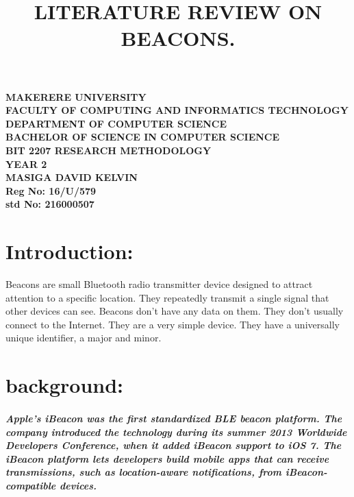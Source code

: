 \documentclass[a4paper,12pt]{article}
\begin{document}
\begin{Huge}
\begin{center}
\begin{normalsize}

\textbf{MAKERERE UNIVERSITY } \\
\textbf{FACULTY OF COMPUTING AND INFORMATICS TECHNOLOGY} \\
\textbf{DEPARTMENT OF COMPUTER SCIENCE} \\
\textbf{BACHELOR OF SCIENCE IN COMPUTER SCIENCE} \\
\textbf{BIT 2207 RESEARCH METHODOLOGY} \\
\textbf{YEAR 2} \\


\textbf{\sc MASIGA DAVID KELVIN } \\
\textbf{\sc Reg No: 16/U/579 } \\
\textbf{\sc std No: 216000507}\\
\end{normalsize}
\end{center}
\end{Huge}
\newpage

\title{LITERATURE REVIEW ON BEACONS.}
\maketitle    
\section{Introduction:}
Beacons are small Bluetooth radio transmitter device designed to attract attention to a specific location. They repeatedly transmit a single signal that other devices can see. Beacons don't have any data on them. They don't usually connect to the Internet. They are a very simple device. They have a universally unique identifier, a major and minor.\cite{Patrick} 
\section{background:}                                                                                                                                                                                    
\paragraph{\sl Apple's iBeacon was the first standardized BLE beacon platform. The company introduced the technology during its summer 2013 Worldwide Developers Conference, when it added iBeacon support to iOS 7. The iBeacon platform lets developers build mobile apps that can receive transmissions, such as location-aware notifications, from iBeacon-compatible devices.}
\end{document}

